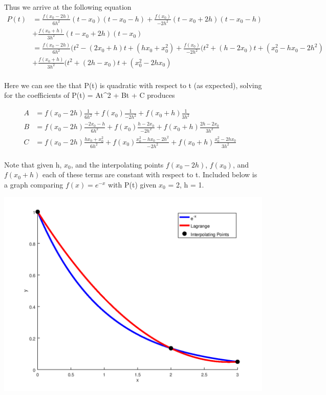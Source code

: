 \documentclass{jhwhw}
\begin{document}
    Thus we arrive at the following equation
    \begin{align*}
	P(t) &= 
	    \frac{f(x_0 - 2h)}{6h^2}(t - x_0)(t - x_0 - h)
	    + \frac{f(x_0)}{-2h^2}(t - x_0 + 2h)(t - x_0 - h) \\
	    &+ \frac{f(x_0 + h)}{3h^2}(t - x_0 + 2h)(t - x_0) &\\
	&=
	    \frac{f(x_0 - 2h)}{6h^2}(t^2 - (2x_0 + h)t + (hx_0+x_0^2)
	    + \frac{f(x_0)}{-2h^2}(t^2 + (h-2x_0)t + (x_0^2 - hx_0 - 2h^2) \\
	    &+ \frac{f(x_0 + h)}{3h^2}(t^2 + (2h - x_0)t + (x_0^2 - 2hx_0) &\\
    \end{align*}

    Here we can see the that P(t) is quadratic with respect to t (as expected),
    solving for the coefficients of P(t) = At^2 + Bt + C produces

    \begin{align*}
	A &= f(x_0-2h)\frac{1}{6h^2} + f(x_0)\frac{1}{-2h^2} + f(x_0+h)\frac{1}{3h^2} &\\
	B &= f(x_0-2h)\frac{-2x_0-h}{6h^2} + f(x_0)\frac{h-2x_0}{-2h^2} + f(x_0+h)\frac{2h-2x_0}{3h^2} &\\
	C &= f(x_0-2h)\frac{hx_0 + x_0^2}{6h^2} + f(x_0)\frac{x_0^2 - hx_0 - 2h^2}{-2h^2} 
	    + f(x_0+h)\frac{x_0^2 - 2hx_0}{3h^2} &\\
    \end{align*}

    Note that given h, $x_0$, and the interpolating points $f(x_0-2h)$, $f(x_0)$, and $f(x_0+h)$ each of these
    terms are constant with respect to t. Included below is a graph comparing $f(x) = e^{-x}$ with P(t) 
    given $x_0$ = 2, h = 1.

    \bigbreak

    \includegraphics[scale=0.75]{p2}
\end{document}
